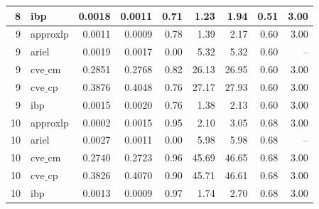\documentclass{article}
\begin{document}
\begin{table}[ht]
\begin{tabular}{rlrrrrrrr}
 8 & ibp & 0.0018 & 0.0011 & 0.71 & 1.23 & 1.94 & 0.51 & 3.00 \\
\hline
 9 & approxlp & 0.0011 & 0.0009 & 0.78 & 1.39 & 2.17 & 0.60 & 3.00 \\
 9 & ariel & 0.0019 & 0.0017 & 0.00 & 5.32 & 5.32 & 0.60 & -- \\
 9 & $\text{cve\_cm}$ & 0.2851 & 0.2768 & 0.82 & 26.13 & 26.95 & 0.60 & 3.00 \\
 9 & $\text{cve\_cp}$ & 0.3876 & 0.4048 & 0.76 & 27.17 & 27.93 & 0.60 & 3.00 \\
 9 & ibp & 0.0015 & 0.0020 & 0.76 & 1.38 & 2.13 & 0.60 & 3.00 \\
\hline
 10 & approxlp & 0.0002 & 0.0015 & 0.95 & 2.10 & 3.05 & 0.68 & 3.00 \\
 10 & ariel & 0.0027 & 0.0011 & 0.00 & 5.98 & 5.98 & 0.68 & -- \\
 10 & $\text{cve\_cm}$ & 0.2740 & 0.2723 & 0.96 & 45.69 & 46.65 & 0.68 & 3.00 \\
 10 & $\text{cve\_cp}$ & 0.3826 & 0.4070 & 0.90 & 45.71 & 46.61 & 0.68 & 3.00 \\
 10 & ibp & 0.0013 & 0.0009 & 0.97 & 1.74 & 2.70 & 0.68 & 3.00 \\
\bottomrule
\end{tabular}
\end{table}
\end{document}
